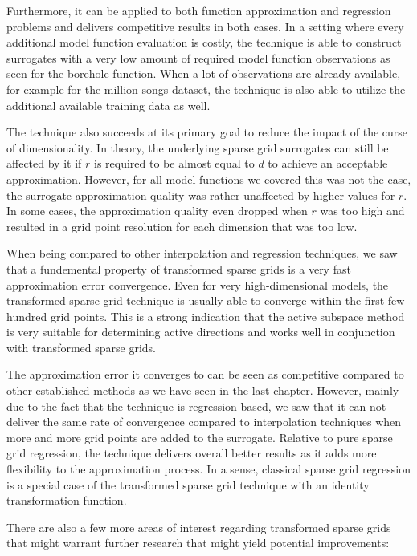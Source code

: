 \documentclass[
  a4paper,  %
  twoside,  %
  bibliography=totoc,
  headsepline,
  cleardoublepage=empty,
  parskip=half,
  draft=false
]{scrbook}
\begin{document}
Furthermore, it can be applied to both function approximation and regression problems and delivers competitive results in both cases.
In a setting where every additional model function evaluation is costly, the technique is able to construct surrogates with a very low amount of required model function observations as seen for the borehole function.
When a lot of observations are already available, for example for the million songs dataset, the technique is also able to utilize the additional available training data as well.

The technique also succeeds at its primary goal to reduce the impact of the curse of dimensionality.
In theory, the underlying sparse grid surrogates can still be affected by it if $r$ is required to be almost equal to $d$ to achieve an acceptable approximation.
However, for all model functions we covered this was not the case, \ie the surrogate approximation quality was rather unaffected by higher values for $r$.
In some cases, the approximation quality even dropped when $r$ was too high and resulted in a grid point resolution for each dimension that was too low.

When being compared to other interpolation and regression techniques, we saw that a fundemental property of transformed sparse grids is a very fast approximation error convergence.
Even for very high-dimensional models, the transformed sparse grid technique is usually able to converge within the first few hundred grid points.
This is a strong indication that the active subspace method is very suitable for determining active directions and works well in conjunction with transformed sparse grids.

The approximation error it converges to can be seen as competitive compared to other established methods as we have seen in the last chapter.
However, mainly due to the fact that the technique is regression based, we saw that it can not deliver the same rate of convergence compared to interpolation techniques when more and more grid points are added to the surrogate.
Relative to pure sparse grid regression, the technique delivers overall better results as it adds more flexibility to the approximation process.
In a sense, classical sparse grid regression is a special case of the transformed sparse grid technique with an identity transformation function.

\vspace{5mm}
\noindent There are also a few more areas of interest regarding transformed sparse grids that might warrant further research that might yield potential improvements:
\vspace{-3mm}
\end{document}
